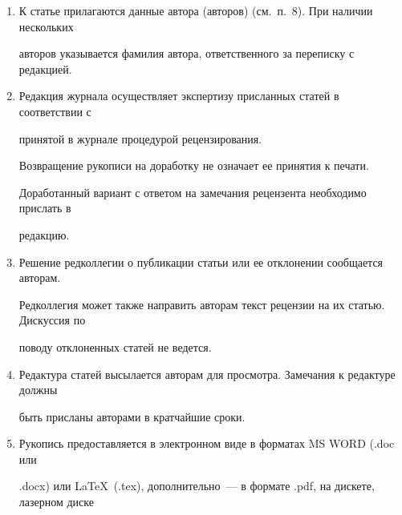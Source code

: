 {\begin{enumerate}[1.]
\item К статье прилагаются данные автора (авторов) (см.\ п.~8). При наличии нескольких


авторов указывается фамилия автора, ответственного за переписку с редакцией.\\[-13.5pt]





\item Редакция журнала осуществляет экспертизу присланных статей в соответствии с


принятой в журнале процедурой рецензирования.





Возвращение рукописи на доработку не означает ее принятия к печати.





Доработанный вариант с ответом на замечания рецензента необходимо прислать в


редакцию.\\[-13.5pt]





\item Решение редколлегии о публикации статьи или ее отклонении сообщается авторам.





Редколлегия может также направить авторам текст рецензии на их статью. Дискуссия по


поводу отклоненных статей не ведется.\\[-13.5pt]













\item Редактура статей высылается авторам для просмотра. Замечания к редактуре должны


быть присланы авторами в кратчайшие сроки.\\[-13.5pt]





\item Рукопись предоставляется в электронном виде в форматах MS WORD (.doc или


.docx) или \LaTeX\  (.tex), дополнительно~--- в формате .pdf, на дискете, лазерном диске



\end{enumerate}}
